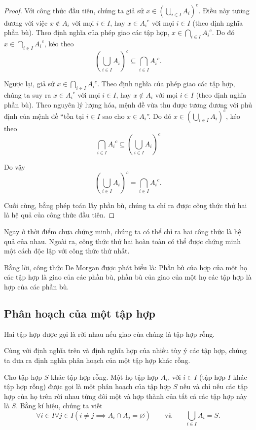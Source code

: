 \begin{proof}
    Với công thức đầu tiên, chúng ta giả sử $x \in {\left(\bigcup_{i\in I}A_{i}\right)}^{c}$. Điều này tương đương với việc $x\notin A_{i}$ với mọi $i\in I$, hay $x\in {A_{i}}^{c}$ với mọi $i\in I$ (theo định nghĩa phần bù). Theo định nghĩa của phép giao các tập hợp, $x\in \bigcap_{i\in I}{A_{i}}^{c}$. Do đó $x\in \bigcap_{i\in I}{A_{i}}^{c}$, kéo theo
    \[
        {\left(\bigcup_{i\in I}A_{i}\right)}^{c} \subseteq \bigcap_{i\in I}{A_{i}}^{c}.
    \]

    Ngược lại, giả sử $x\in \bigcap_{i\in I}{A_{i}}^{c}$. Theo định nghĩa của phép giao các tập hợp, chúng ta suy ra $x\in {A_{i}}^{c}$ với mọi $i\in I$, hay $x\notin A_{i}$ với mọi $i\in I$ (theo định nghĩa phần bù). Theo nguyên lý lượng hóa, mệnh đề vừa thu được tương đương với phủ định của mệnh đề ``tồn tại $i\in I$ sao cho $x\in A_{i}$''. Do đó $x\in {\left(\bigcup_{i\in I}A_{i}\right)}^{c}$, kéo theo
    \[
        \bigcap_{i\in I}{A_{i}}^{c} \subseteq {\left(\bigcup_{i\in I}A_{i}\right)}^{c}
    \]

    Do vậy
    \[
        {\left(\bigcup_{i\in I}A_{i}\right)}^{c} = \bigcap_{i\in I}{A_{i}}^{c}.
    \]

    Cuối cùng, bằng phép toán lấy phần bù, chúng ta chỉ ra được công thức thứ hai là hệ quả của công thức đầu tiên.
\end{proof}

Ngay ở thời điểm chưa chứng minh, chúng ta có thể chỉ ra hai công thức là hệ quả của nhau. Ngoài ra, công thức thứ hai hoàn toàn có thể được chứng minh một cách độc lập với công thức thứ nhất.

Bằng lời, công thức De Morgan được phát biểu là: Phần bù của hợp của một họ các tập hợp là giao của các phần bù, phần bù của giao của một họ các tập hợp là hợp của các phần bù.

\subsection{Phân hoạch của một tập hợp}

\begin{definition}
    Hai tập hợp được gọi là rời nhau nếu giao của chúng là tập hợp rỗng.
\end{definition}

Cùng với định nghĩa trên và định nghĩa hợp của nhiều tùy ý các tập hợp, chúng ta đưa ra định nghĩa phân hoạch của một tập hợp khác rỗng.

\begin{definition}
    Cho tập hợp $S$ khác tập hợp rỗng. Một họ tập hợp $A_{i}$, với $i\in I$ (tập hợp $I$ khác tập hợp rỗng) được gọi là một phân hoạch của tập hợp $S$ nếu và chỉ nếu các tập hợp của họ trên rời nhau từng đôi một và hợp thành của tất cả các tập hợp này là $S$. Bằng kí hiệu, chúng ta viết
    \[
        \forall i\in I\forall j\in I (i\ne j \implies A_{i}\cap A_{j} = \varnothing) \qquad\text{và}\qquad\bigcup_{i\in I}A_{i} = S.
    \]
\end{definition}


